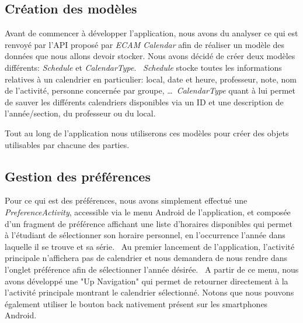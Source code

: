 \documentclass{article}
\begin{document}
	\subsection{Création des modèles}
		Avant de commencer à développer l'application, nous avons du analyser ce qui est renvoyé par
        l'API proposé par \textit{ECAM Calendar}
		afin de réaliser un modèle des données que nous allons devoir stocker. Nous avons décidé de créer deux modèles différents:
        \textit{Schedule} et \textit{CalendarType}. \
        \textit{Schedule} stocke toutes les informations relatives à un calendrier en particulier: local, date et heure,
		professeur, note, nom de l'activité, personne concernée par groupe, \ldots \
        \textit{CalendarType} quant à lui permet de sauver les différents calendriers disponibles via un ID et une description de l'année/section,
		du professeur ou du local. \

		Tout au long de l'application nous utiliserons ces modèles pour créer des objets utilisables par chacune des parties.

	\subsection{Gestion des préférences}
    Pour ce qui est des préférences, nous avons simplement effectué une \textit{PreferenceActivity}, accessible via le menu Android de l'application,
		et composée d'un fragment de préférence affichant une liste d'horaires disponibles
		qui permet à l'étudiant de sélectionner son horaire personnel, en l'occurrence l'année dans laquelle il se trouve et sa série. \
		Au premier lancement de l'application, l'activité principale n'affichera pas de calendrier et nous demandera de nous rendre dans
		l'onglet préférence afin de sélectionner l'année désirée. \
		A partir de ce menu, nous avons développé une "Up Navigation" qui permet de retourner directement à la l'activité principale montrant
		le calendrier sélectionné. Notons que nous pouvons également utiliser le bouton back
        nativement présent sur les smartphones Android.
\end{document}
